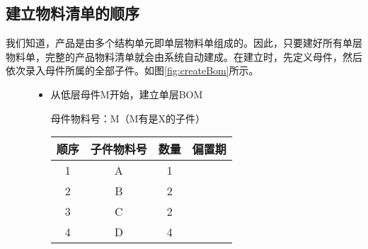 \subsection {建立物料清单的顺序}

        我们知道，产品是由多个结构单元即单层物料单组成的。因此，只要建好所有单层物料单，完整的产品物料清单就会由系统自动建成。在建立时，先定义母件，然后依次录入母件所属的全部子件。如图\ref{fig:createBom}所示。

        \begin{figure}[H]
            \centering

            \begin{itemize}
                \item 从低层母件M开始，建立单层BOM \vskip 3mm

                    \begin{minipage}{18em}
                        \footnotesize 母件物料号：M（M有是X的子件）
                        \vskip 2mm
                        \begin{tabular}{c|c|c|c}
                            顺序 & 子件物料号 & 数量 & 偏置期 \\ \hline
                            1 & A & 1 & \\
                            2 & B & 2 & \\
                            3 & C & 2 & \\
                            4 & D & 4 & \\
                        \end{tabular}
                    \end{minipage}
                    \begin{minipage}{14em}
                        \centering \footnotesize


\end{minipage}
\end{itemize}
\end{figure}
